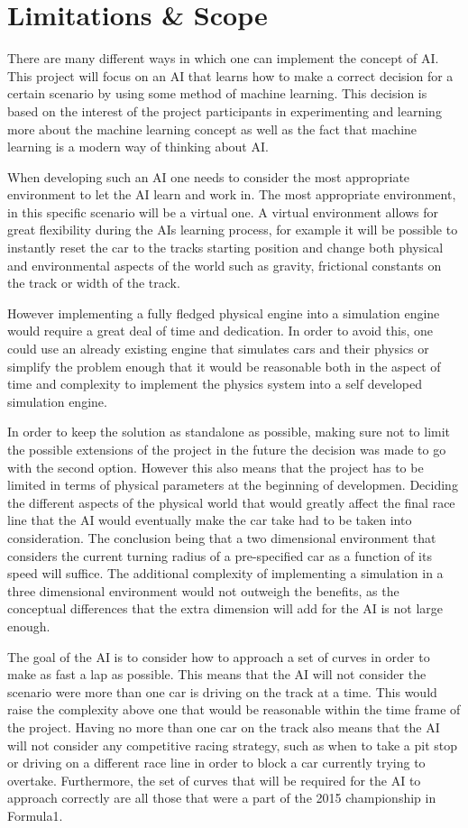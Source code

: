 \chapter{Limitations \& Scope}

There are many different ways in which one can implement the concept of AI. This project will focus on an AI that learns how to make a correct decision for a certain scenario by using some method of machine learning. This decision is based on the interest of the project participants in experimenting and learning more about the machine learning concept as well as the fact that machine learning is a modern way of thinking about AI.

When developing such an AI one needs to consider the most appropriate environment to let the AI learn and work in. The most appropriate environment, in this specific scenario will be a virtual one. A virtual environment allows for great flexibility during the AIs learning process, for example it will be possible to instantly reset the car to the tracks starting position and change both physical and environmental aspects of the world such as gravity, frictional constants on the track or width of the track.

However implementing a fully fledged physical engine into a simulation engine would require a great deal of time and dedication. In order to avoid this, one could use an already existing engine that simulates cars and their physics or simplify the problem enough that it would be reasonable both in the aspect of time and complexity to implement the physics system into a self developed simulation engine.

In order to keep the solution as standalone as possible, making sure not to limit the possible extensions of the project in the future the decision was made to go with the second option. However this also means that the project has to be limited in terms of physical parameters at the beginning of developmen. Deciding the different aspects of the physical world that would greatly affect the final race line that the AI would eventually make the car take had to be taken into consideration. The conclusion being that a two dimensional environment that considers the current turning radius of a pre-specified car as a function of its speed will suffice. The additional complexity of implementing a simulation in a three dimensional environment would not outweigh the benefits, as the conceptual differences that the extra dimension will add for the AI is not large enough.

The goal of the AI is to consider how to approach a set of curves in order to make as fast a lap as possible. This means that the AI will not consider the scenario were more than one car is driving on the track at a time. This would raise the complexity above one that would be reasonable within the time frame of the project. Having no more than one car on the track also means that the AI will not consider any competitive racing strategy, such as when to take a pit stop or driving on a different race line in order to block a car currently trying to overtake. Furthermore, the set of curves that will be required for the AI to approach correctly are all those that were a part of the 2015 championship in Formula1.
